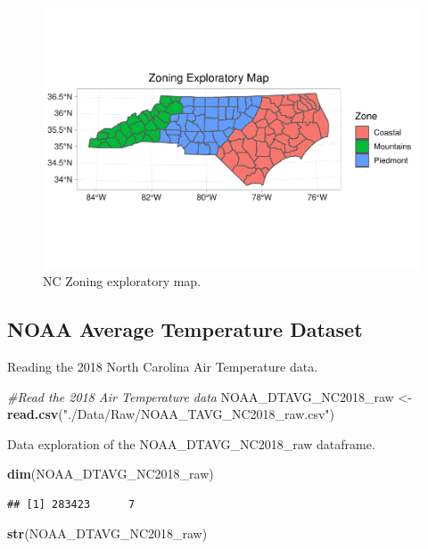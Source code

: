 \documentclass[12pt,]{article}
\newenvironment{Shaded}{\begin{snugshade}}{\end{snugshade}}
\newcommand{\KeywordTok}[1]{\textcolor[rgb]{0.13,0.29,0.53}{\textbf{#1}}}
\newcommand{\StringTok}[1]{\textcolor[rgb]{0.31,0.60,0.02}{#1}}
\newcommand{\CommentTok}[1]{\textcolor[rgb]{0.56,0.35,0.01}{\textit{#1}}}
\newcommand{\NormalTok}[1]{#1}
\begin{document}
\begin{figure}
\centering
\includegraphics{./Outputunnamed-chunk-24-1.pdf}
\caption{NC Zoning exploratory map. \label{Zoneplot}}
\end{figure}

\subsection{NOAA Average Temperature
Dataset}\label{noaa-average-temperature-dataset-1}

Reading the 2018 North Carolina Air Temperature data.

\begin{Shaded}
\begin{Highlighting}[]
\CommentTok{#Read the 2018 Air Temperature data}
\NormalTok{NOAA_DTAVG_NC2018_raw <-}\StringTok{ }\KeywordTok{read.csv}\NormalTok{(}\StringTok{"./Data/Raw/NOAA_TAVG_NC2018_raw.csv"}\NormalTok{)}
\end{Highlighting}
\end{Shaded}

Data exploration of the NOAA\_DTAVG\_NC2018\_raw dataframe.

\begin{Shaded}
\begin{Highlighting}[]
\KeywordTok{dim}\NormalTok{(NOAA_DTAVG_NC2018_raw)}
\end{Highlighting}
\end{Shaded}

\begin{verbatim}
## [1] 283423      7
\end{verbatim}

\begin{Shaded}
\begin{Highlighting}[]
\KeywordTok{str}\NormalTok{(NOAA_DTAVG_NC2018_raw)}
\end{Highlighting}
\end{Shaded}
\end{document}
